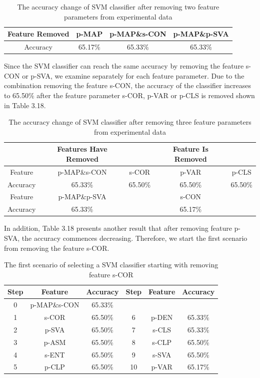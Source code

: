 \begin{table}[!h]
\begin{center}
\renewcommand{\arraystretch}{0.5}
\begin{tabular}{|| c | c | c c ||}
\hline
 Feature Removed & p-MAP & p-MAP\&s-CON & p-MAP\&p-SVA \\
 \hline
 Accuracy & 65.17\% & 65.33\% & 65.33\% \\
 \hline
\end{tabular}
\end{center}
\caption{The accuracy change of SVM classifier after removing two feature parameters from experimental data}
\end{table}
Since the SVM classifier can reach the same accuracy by removing the feature s-CON or p-SVA, we examine separately for each feature parameter. Due to the combination removing the feature s-CON, the accuracy of the classifier increases to 65.50\% after the feature parameter s-COR, p-VAR or p-CLS is removed shown in Table 3.18. 
\begin{table}[!h]
\begin{center}
\renewcommand{\arraystretch}{0.5}
\begin{tabular}{|| c | c | c c c||}
\hline
 & Features Have Removed & & Feature Is Removed &\\
\hline
 Feature & p-MAP\&s-CON & s-COR & p-VAR & p-CLS\\
 \hline
 Accuracy & 65.33\% & 65.50\% & 65.50\% & 65.50\% \\
 \hline
 Feature & p-MAP\&p-SVA & & s-CON &\\
 \hline
 Accuracy & 65.33\% & & 65.17\% & \\
 \hline
\end{tabular}
\end{center}
\caption{The accuracy change of SVM classifier after removing three feature parameters from experimental data}
\end{table}
In addition, Table 3.18 presents another result that after removing feature p-SVA, the accuracy commences decreasing. Therefore, we start the first scenario from removing the feature s-COR.    
\begin{table}[!h]
\begin{center}
\renewcommand{\arraystretch}{0.5}
\begin{tabular}{|| c | c | c | c | c | c ||}
\hline
 Step & Feature & Accuracy & Step & Feature & Accuracy \\
\hline
 0 & p-MAP\;\&\;s-CON & 65.33\% & & & \\
\hline
 1 & s-COR & 65.50\% & 6 & p-DEN & 65.33\% \\
 2 & p-SVA & 65.50\% & 7 & s-CLS & 65.33\% \\
 3 & p-ASM & 65.50\% & 8 & s-CLP & 65.50\% \\
 4 & s-ENT & 65.50\% & 9 & s-SVA & 65.50\% \\
 5 & p-CLP & 65.50\% & 10 & p-VAR & 65.17\% \\
\hline
\end{tabular}
\end{center}
\caption{The first scenario of selecting a SVM classifier starting with removing feature s-COR}
\end{table}
